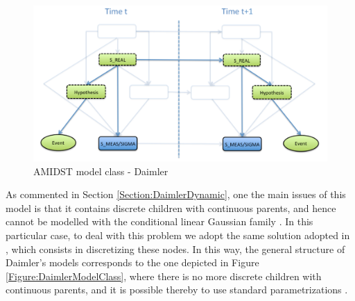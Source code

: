 \begin{figure}[ht!]
\begin{center}
\includegraphics[scale=0.39]{./figures/AMIDSTModelClassDaimler}
\caption{\label{Figure:AMIDSTModelClassDaimler} AMIDST model class - Daimler}
\end{center}
\end{figure}

As commented in Section \ref{Section:DaimlerDynamic}, one the main issues of this model is that it contains discrete children with continuous parents, and hence cannot be modelled with the conditional linear Gaussian family \cite{JensenNielsen2007}. In this particular case, to deal with this problem we adopt the same solution adopted in \cite{kasper2012object}, which consists in discretizing these nodes. In this way, the general structure of Daimler's models corresponds to the one depicted in Figure \ref{Figure:DaimlerModelClass}, where there is no more discrete children with continuous parents, and it is possible thereby to use standard parametrizations \cite{JensenNielsen2007}. 


%
%



